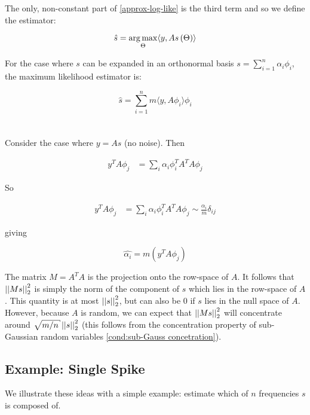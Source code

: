 The only, non-constant part of \eqref{approx-log-like} is the third term and so we define the estimator:

\begin{equation}
\hat{s} = \operatorname*{arg\,max}_{\Theta} \langle y , As\left(\Theta\right)\rangle
\label{eq: compressive-estimator}
\end{equation}

For the case where \(s\) can be expanded in an orthonormal basis \(s = \sum_{i=1}^n \alpha_i\phi_i\), the maximum likelihood estimator is:

\begin{equation}
\hat{s} = \sum_{i=1}^n m\langle y, A\phi_i\rangle \phi_i
\end{equation}
\\
\\
Consider the case where \( y = As\) (no noise). Then

\begin{align*}
y^TA\phi_j &= \sum_i \alpha_i \phi_i^TA^TA\phi_j
\end{align*}

So 

\begin{align*}
y^TA\phi_j &= \sum_i \alpha_i \phi_i^TA^TA\phi_j \sim \frac{\alpha_i}{m} \delta_{ij}
\end{align*}

giving
 
\begin{equation}
\hat{\alpha_i} = m\left(y^TA\phi_j\right)
\end{equation}

\begin{remark}
The matrix \(M = A^TA\) is the projection onto the row-space of \(A\). It follows that \(\left|\left|Ms\right|\right|_2^2\) is simply the norm of the component of \(s\) which lies in the row-space of \(A\). This quantity is at most \(\left|\left|s\right|\right|_2^2\), but can also be \(0\) if \(s\) lies in the null space of \(A\). However, because \(A\) is random, we can expect that \(\left|\left|Ms\right|\right|_2^2\) will concentrate around \(\sqrt{m/n}\vectornorm{s}_2^2\) (this follows from the concentration property of sub-Gaussian random variables \eqref{cond:sub-Gauss concetration}).
\end{remark}

\subsection{Example: Single Spike}
We illustrate these ideas with a simple example: estimate which of \(n\) frequencies \(s\) is composed of.

